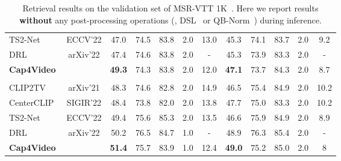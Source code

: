 \documentclass[10pt,twocolumn,letterpaper]{article}
\begin{document}
\begin{table*}
{\begin{tabular}{lc|ccccc|ccccc}
    TS2-Net~\cite{liu2022ts2net} & ECCV'22 & 47.0 & 74.5 & 83.8 & 2.0 & 13.0 & 45.3 & 74.1 & 83.7 & 2.0 & 9.2 \\
    DRL~\cite{wang2022disentangled} & arXiv'22 & 47.4 & 74.6 & 83.8 & 2.0 & - & 45.3 & 73.9 & 83.3 & 2.0 & - \\
    \rowcolor{gray!20} \textbf{Cap4Video}  & & \textbf{49.3} & 74.3 & 83.8 & 2.0 & 12.0 & \textbf{47.1} & 73.7 & 84.3 & 2.0 & 8.7 \\
    \midrule
    \rowcolor{mygray}
    \multicolumn{12}{l}{\emph{CLIP-ViT-B/16}} \\
    CLIP2TV~\cite{gao2021clip2tv} & arXiv'21 & 48.3 & 74.6 & 82.8 & 2.0 & 14.9 & 46.5 & 75.4 & 84.9 & 2.0 & 10.2 \\
    CenterCLIP~\cite{zhao2022centerclip} & SIGIR'22 & 48.4 & 73.8 & 82.0 & 2.0 & 13.8 & 47.7 & 75.0 & 83.3 & 2.0 & 10.2 \\
    TS2-Net~\cite{liu2022ts2net} & ECCV'22 & 49.4 & 75.6 & 85.3 & 2.0 & 13.5 & 46.6 & 75.9 & 84.9 & 2.0 & 8.9 \\
    DRL~\cite{wang2022disentangled} & arXiv'22 & 50.2 & 76.5 & 84.7 & 1.0 & - & 48.9 & 76.3 & 85.4 & 2.0 & - \\
    \rowcolor{gray!20} \textbf{Cap4Video}  & & \textbf{51.4} & 75.7 &  83.9 & 1.0 & 12.4 & \textbf{49.0} & 75.2 & 85.0 & 2.0 & 8 \\
    \bottomrule
  \end{tabular}}
  \vspace{-1mm}
  \caption{Retrieval results on the validation set of MSR-VTT 1K~\cite{xu2016msrvtt}. Here we report results \textbf{without} any post-processing operations (\eg, DSL~\cite{cheng202camoe} or QB-Norm~\cite{bogolin2022qbnorm}) during inference.
}
  \label{tab:sota-MSRVTT}
\end{table*} 
\end{document}
